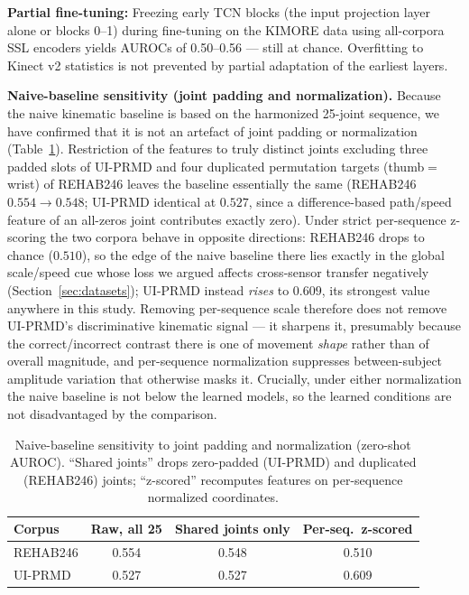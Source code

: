 \documentclass[10pt,journal]{IEEEtran}
\begin{document}
\textbf{Partial fine-tuning:} Freezing early TCN blocks (the input projection layer alone or blocks 0--1) during fine-tuning on the KIMORE data using all-corpora SSL encoders yields AUROCs of 0.50--0.56 --- still at chance. Overfitting to Kinect v2 statistics is not prevented by partial adaptation of the earliest layers.

\textbf{Naive-baseline sensitivity (joint padding and normalization).} Because the naive kinematic baseline is based on the harmonized 25-joint sequence, we have confirmed that it is not an artefact of joint padding or normalization (Table~\ref{tab:naive-sens}). Restriction of the features to truly distinct joints excluding three padded slots of UI-PRMD and four duplicated permutation targets (thumb${=}$wrist) of REHAB246 leaves the baseline essentially the same (REHAB246 $0.554 \to 0.548$; UI-PRMD identical at $0.527$, since a difference-based path/speed feature of an all-zeros joint contributes exactly zero). Under strict per-sequence z-scoring the two corpora behave in opposite directions: REHAB246 drops to chance ($0.510$), so the edge of the naive baseline there lies exactly in the global scale/speed cue whose loss we argued affects cross-sensor transfer negatively (Section~\ref{sec:datasets}); UI-PRMD instead \emph{rises} to $0.609$, its strongest value anywhere in this study. Removing per-sequence scale therefore does not remove UI-PRMD's discriminative kinematic signal --- it sharpens it, presumably because the correct/incorrect contrast there is one of movement \emph{shape} rather than of overall magnitude, and per-sequence normalization suppresses between-subject amplitude variation that otherwise masks it. Crucially, under either normalization the naive baseline is not below the learned models, so the learned conditions are not disadvantaged by the comparison.

\begin{table}[t]
\centering
\caption{Naive-baseline sensitivity to joint padding and normalization (zero-shot AUROC). ``Shared joints'' drops zero-padded (UI-PRMD) and duplicated (REHAB246) joints; ``z-scored'' recomputes features on per-sequence normalized coordinates.}
\label{tab:naive-sens}
\begin{tabular}{lccc}
\toprule
Corpus & Raw, all 25 & Shared joints only & Per-seq.\ z-scored \\
\midrule
REHAB246 & 0.554 & 0.548 & 0.510 \\
UI-PRMD  & 0.527 & 0.527 & 0.609 \\
\bottomrule
\end{tabular}
\end{table}
\end{document}
